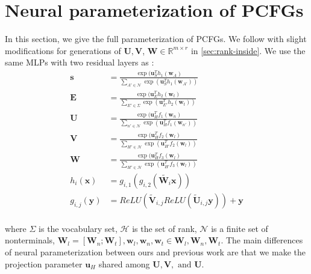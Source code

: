 \documentclass[11pt]{article}
\begin{document}
\section{Neural parameterization of PCFGs}
\label{appd:pcfg}
In this section, we give the full parameterization of PCFGs. We follow \citet{yang-etal-2021-pcfgs} with slight modifications for generations of $\mathbf{U}, \mathbf{V}$, $\mathbf{W} \in \mathbb{R}^{m\times r}$ in \ref{sec:rank-inside}. We use the same MLPs with two residual layers as \citet{yang-etal-2021-pcfgs}:
\begin{align*}
    \mathbf{s} &= \frac{\exp(\mathbf{u}_S^Th_1(\mathbf{w}_A)}{\sum_{A' \in \mathcal{N}}\exp(\mathbf{u}_S^Th_1(\mathbf{w}_{A'}))}\\
    \mathbf{E} &= \frac{\exp(\mathbf{u}_E^Th_2(\mathbf{w}_t)}{\sum_{E' \in \Sigma}\exp(\mathbf{u}_{E'}^Th_2(\mathbf{w}_{t}))}\\
    \mathbf{U} &= \frac{\exp(\mathbf{u}_H^Tf_1(\mathbf{w}_n)}{\sum_{n' \in \mathcal{N}}\exp(\mathbf{u}_H^Tf_1(\mathbf{w}_{n'}))}\\
    \mathbf{V} &= \frac{\exp(\mathbf{u}_H^Tf_2(\mathbf{w}_l)}{\sum_{H' \in \mathcal{H}}\exp(\mathbf{u}_{H'}^Tf_2(\mathbf{w}_{l}))}\\
    \mathbf{W} &= \frac{\exp(\mathbf{u}_H^Tf_3(\mathbf{w}_l)}{\sum_{H' \in \mathcal{H}}\exp(\mathbf{u}_{H'}^Tf_3(\mathbf{w}_{l}))}\\
    h_i(\mathbf{x}) &= g_{i,1}(g_{i,2}(\tilde{\mathbf{W}_i}\mathbf{x}))\\
    g_{i,j}(\mathbf{y}) &= ReLU(\tilde{\mathbf{V}}_{i,j}ReLU(\tilde{\mathbf{U}}_{i,j}\mathbf{y})) + \mathbf{y}\\
\end{align*}

where $\Sigma$ is the vocabulary set, $\mathcal{H}$ is the set of rank, $\mathcal{N}$ is a finite set of nonterminals, $\mathbf{W}_l = [\mathbf{W}_n;\mathbf{W}_t], \mathbf{w}_l, \mathbf{w}_n, \mathbf{w}_t \in \mathbf{W}_l, \mathbf{W}_n, \mathbf{W}_t$. The main differences of neural parameterization between ours and previous work are that we make the projection parameter $\mathbf{u}_H$ shared among $\mathbf{U}, \mathbf{V},\text{ and } \mathbf{U}$. 
\end{document}
